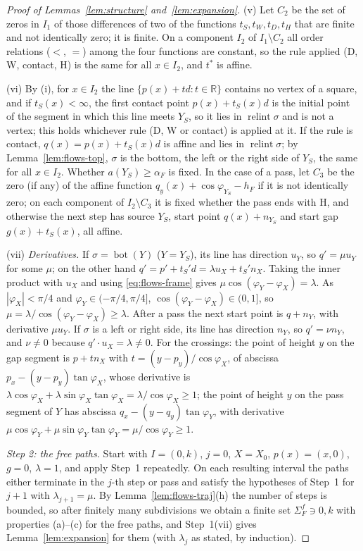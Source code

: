 \documentclass[11pt]{amsart}
\newcommand{\R}{\mathbb R}
\newcommand{\relint}{\operatorname{relint}}
\newcommand{\Bot}{\operatorname{bot}}
\theoremstyle{definition}
\theoremstyle{remark}
\numberwithin{equation}{section}
\begin{document}
\begin{proof}[Proof of Lemmas~\ref{lem:structure} and~\ref{lem:expansion}]
(v) Let $C_2$ be the set of zeros in $I_1$ of those differences of two of the functions $t_S,t_W,t_D,t_H$ that are finite
and not identically zero; it is finite. On a component $I_2$ of $I_1\setminus C_2$ all order relations ($<$, $=$) among
the four functions are constant, so the rule applied (D, W, contact, H) is the same for all $x\in I_2$, and $t^*$ is
affine.

(vi) By (i), for $x\in I_2$ the line $\{p(x)+td:t\in\R\}$ contains no vertex of a square, and if $t_S(x)<\infty$, the
first contact point $p(x)+t_S(x)d$ is the initial point of the segment in which this line meets $Y_S$, so it lies in
$\relint\sigma$ and is not a vertex; this holds whichever rule (D, W or contact) is applied at it. If the rule is
contact, $q(x)=p(x)+t_S(x)d$ is affine and lies in $\relint\sigma$; by Lemma~\ref{lem:flows-top}, $\sigma$ is the
bottom, the left or the right side of $Y_S$, the same for all $x\in I_2$. Whether $a(Y_S)\ge\alpha_F$ is fixed. In the case of a pass, let $C_3$ be the
zero (if any) of the affine function $q_y(x)+\cos\varphi_{Y_S}-h_F$ if it is not identically zero; on each component of
$I_2\setminus C_3$ it is fixed whether the pass ends with H, and otherwise the next step has source $Y_S$, start point
$q(x)+n_{Y_S}$ and start gap $g(x)+t_S(x)$, all affine.

(vii) \emph{Derivatives.} If $\sigma=\Bot(Y)$ ($Y=Y_S$), its line has direction $u_Y$, so $q'=\mu u_Y$ for some $\mu$;
on the other hand $q'=p'+t_S'd=\lambda u_X+t_S'n_X$. Taking the inner product with $u_X$ and using
\eqref{eq:flows-frame} gives $\mu\cos(\varphi_Y-\varphi_X)=\lambda$. As $|\varphi_X|<\pi/4$ and
$\varphi_Y\in(-\pi/4,\pi/4]$, $\cos(\varphi_Y-\varphi_X)\in(0,1]$, so $\mu=\lambda/\cos(\varphi_Y-\varphi_X)\ge\lambda$.
After a pass the next start point is $q+n_Y$, with derivative $\mu u_Y$. If $\sigma$ is a left or right side, its line
has direction $n_Y$, so $q'=\nu n_Y$, and $\nu\ne0$ because $q'\cdot u_X=\lambda\ne0$. For the crossings: the point of
height $y$ on the gap segment is $p+tn_X$ with $t=(y-p_y)/\cos\varphi_X$, of abscissa $p_x-(y-p_y)\tan\varphi_X$, whose
derivative is $\lambda\cos\varphi_X+\lambda\sin\varphi_X\tan\varphi_X=\lambda/\cos\varphi_X\ge1$; the point of height $y$ on
the pass segment of $Y$ has abscissa $q_x-(y-q_y)\tan\varphi_Y$, with derivative
$\mu\cos\varphi_Y+\mu\sin\varphi_Y\tan\varphi_Y=\mu/\cos\varphi_Y\ge1$.

\emph{Step 2: the free paths.} Start with $I=(0,k)$, $j=0$, $X=X_0$, $p(x)=(x,0)$, $g=0$, $\lambda=1$, and apply Step~1
repeatedly. On each resulting interval the paths either terminate in the $j$-th step or pass and satisfy the hypotheses
of Step~1 for $j+1$ with $\lambda_{j+1}=\mu$. By Lemma~\ref{lem:flows-traj}(h) the number of steps is bounded, so after
finitely many subdivisions we obtain a finite set $\Sigma^f_F\ni0,k$ with properties (a)--(c) for the free paths, and
Step~1(vii) gives Lemma~\ref{lem:expansion} for them (with $\lambda_j$ as stated, by induction).


\end{proof}
\end{document}
